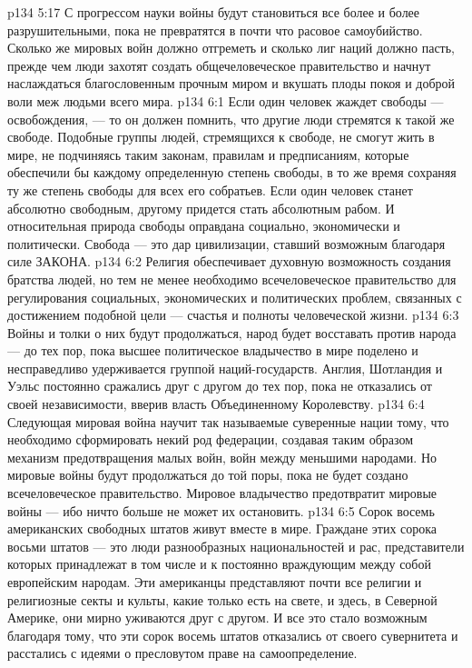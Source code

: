 \vs p134 5:17 С прогрессом науки войны будут становиться все более и более разрушительными, пока не превратятся в почти что расовое самоубийство. Сколько же мировых войн должно отгреметь и сколько лиг наций должно пасть, прежде чем люди захотят создать общечеловеческое правительство и начнут наслаждаться благословенным прочным миром и вкушать плоды покоя и доброй воли меж людьми всего мира.
\vs p134 6:1 Если один человек жаждет свободы --- освобождения, --- то он должен помнить, что  другие люди стремятся к такой же свободе. Подобные группы людей, стремящихся к свободе, не смогут жить в мире, не подчиняясь таким законам, правилам и предписаниям, которые обеспечили бы каждому определенную степень свободы, в то же время сохраняя ту же степень свободы для всех его собратьев. Если один человек станет абсолютно свободным, другому придется стать абсолютным рабом. И относительная природа свободы оправдана социально, экономически и политически. Свобода --- это дар цивилизации, ставший возможным благодаря силе ЗАКОНА.
\vs p134 6:2 Религия обеспечивает духовную возможность создания братства людей, но тем не менее необходимо всечеловеческое правительство для регулирования социальных, экономических и политических проблем, связанных с достижением подобной цели --- счастья и полноты человеческой жизни.
\vs p134 6:3 Войны и толки о них будут продолжаться, народ будет восставать против народа --- до тех пор, пока высшее политическое владычество в мире поделено и несправедливо удерживается группой наций\hyp{}государств. Англия, Шотландия и Уэльс постоянно сражались друг с другом до тех пор, пока не отказались от своей независимости, вверив власть Объединенному Королевству.
\vs p134 6:4 Следующая мировая война научит так называемые суверенные нации тому, что необходимо сформировать некий род федерации, создавая таким образом механизм предотвращения малых войн, войн между меньшими народами. Но мировые войны будут продолжаться до той поры, пока не будет создано всечеловеческое правительство. Мировое владычество предотвратит мировые войны --- ибо ничто больше не может их остановить.
\vs p134 6:5 Сорок восемь американских свободных штатов живут вместе в мире. Граждане этих сорока восьми штатов --- это люди разнообразных национальностей и рас, представители которых принадлежат в том числе и к постоянно враждующим между собой европейским народам. Эти американцы представляют почти все религии и религиозные секты и культы, какие только есть на свете, и здесь, в Северной Америке, они мирно уживаются друг с другом. И все это стало возможным благодаря тому, что эти сорок восемь штатов отказались от своего сувернитета и расстались с идеями о пресловутом праве на самоопределение.
